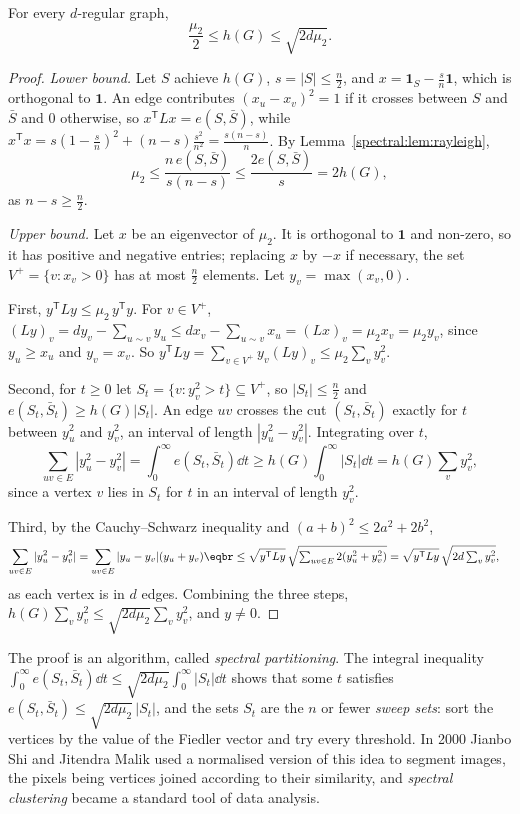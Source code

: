 \begin{theorem}\label{spectral:thm:cheeger}
For every $d$-regular graph,
\[
\frac{\mu_2}2\le h(G)\le\sqrt{2d\mu_2}.
\]
\end{theorem}
\begin{proof}
\emph{Lower bound.} Let $S$ achieve $h(G)$, $s=|S|\le\frac n2$, and $x=\mathbf1_S-\frac sn\mathbf1$, which is orthogonal to $\mathbf1$. An edge contributes $(x_u-x_v)^2=1$ if it crosses between
$S$ and $\bar S$ and $0$ otherwise, so $x^{\mathsf T}Lx=e(S,\bar S)$, while $x^{\mathsf T}x=s(1-\frac sn)^2+(n-s)\frac{s^2}{n^2}=\frac{s(n-s)}n$. By Lemma~\ref{spectral:lem:rayleigh},
\[
\mu_2\le\frac{n\,e(S,\bar S)}{s(n-s)}\le\frac{2e(S,\bar S)}s=2h(G),
\]
as $n-s\ge\frac n2$.

\emph{Upper bound.} Let $x$ be an eigenvector of $\mu_2$. It is orthogonal to $\mathbf1$ and non-zero, so it has positive and negative entries; replacing $x$ by $-x$ if necessary, the set
$V^+=\{v:x_v>0\}$ has at most $\frac n2$ elements. Let $y_v=\max(x_v,0)$.

First, $y^{\mathsf T}Ly\le\mu_2\,y^{\mathsf T}y$. For $v\in V^+$, $(Ly)_v=dy_v-\sum_{u\sim v}y_u\le dx_v-\sum_{u\sim v}x_u=(Lx)_v=\mu_2x_v=\mu_2y_v$, since $y_u\ge x_u$ and $y_v=x_v$. So
$y^{\mathsf T}Ly=\sum_{v\in V^+}y_v(Ly)_v\le\mu_2\sum_vy_v^2$.

Second, for $t\ge0$ let $S_t=\{v:y_v^2>t\}\subseteq V^+$, so $|S_t|\le\frac n2$ and $e(S_t,\bar S_t)\ge h(G)|S_t|$. An edge $uv$ crosses the cut $(S_t,\bar S_t)$ exactly for $t$ between $y_u^2$ and $y_v^2$,
an interval of length $|y_u^2-y_v^2|$. Integrating over $t$,
\[
\sum_{uv\in E}|y_u^2-y_v^2|=\int_0^\infty e(S_t,\bar S_t)\dd t\ge h(G)\int_0^\infty|S_t|\dd t=h(G)\sum_vy_v^2,
\]
since a vertex $v$ lies in $S_t$ for $t$ in an interval of length $y_v^2$.

Third, by the Cauchy--Schwarz inequality and $(a+b)^2\le2a^2+2b^2$,
\[
\begin{aligned}\sum_{uv\in E}|y_u^2-y_v^2|&=\sum_{uv\in E}|y_u-y_v|(y_u+y_v)\eqbr\le\sqrt{y^{\mathsf T}Ly}\,\sqrt{\textstyle\sum_{uv\in E}2(y_u^2+y_v^2)}=\sqrt{y^{\mathsf T}Ly}\,\sqrt{2d\textstyle\sum_vy_v^2},\end{aligned}
\]
as each vertex is in $d$ edges. Combining the three steps, $h(G)\sum_vy_v^2\le\sqrt{2d\mu_2}\sum_vy_v^2$, and $y\neq0$.
\end{proof}

The proof is an algorithm, called \emph{spectral partitioning}. The integral inequality $\int_0^\infty e(S_t,\bar S_t)\dd t\le\sqrt{2d\mu_2}\int_0^\infty|S_t|\dd t$ shows that some $t$ satisfies
$e(S_t,\bar S_t)\le\sqrt{2d\mu_2}\,|S_t|$, and the sets $S_t$ are the $n$ or fewer \emph{sweep sets}: sort the vertices by the value of the Fiedler vector and try every threshold. In 2000 Jianbo Shi and
Jitendra Malik used a normalised version of this idea to segment images, the pixels being vertices joined according to their similarity, and \emph{spectral clustering} became a standard tool of
data analysis.

